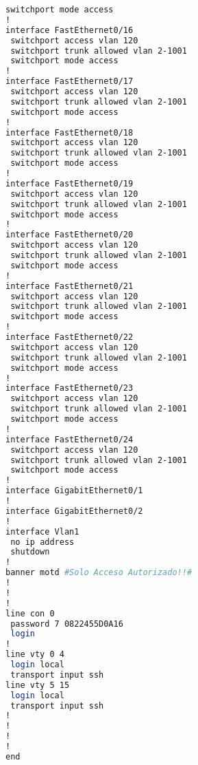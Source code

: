 \begin{lstlisting}[language=Bash, caption={Configuración Completa Switch Asesoría Jurídica}]
 switchport mode access
!
interface FastEthernet0/16
 switchport access vlan 120
 switchport trunk allowed vlan 2-1001
 switchport mode access
!
interface FastEthernet0/17
 switchport access vlan 120
 switchport trunk allowed vlan 2-1001
 switchport mode access
!
interface FastEthernet0/18
 switchport access vlan 120
 switchport trunk allowed vlan 2-1001
 switchport mode access
!
interface FastEthernet0/19
 switchport access vlan 120
 switchport trunk allowed vlan 2-1001
 switchport mode access
!
interface FastEthernet0/20
 switchport access vlan 120
 switchport trunk allowed vlan 2-1001
 switchport mode access
!
interface FastEthernet0/21
 switchport access vlan 120
 switchport trunk allowed vlan 2-1001
 switchport mode access
!
interface FastEthernet0/22
 switchport access vlan 120
 switchport trunk allowed vlan 2-1001
 switchport mode access
!
interface FastEthernet0/23
 switchport access vlan 120
 switchport trunk allowed vlan 2-1001
 switchport mode access
!
interface FastEthernet0/24
 switchport access vlan 120
 switchport trunk allowed vlan 2-1001
 switchport mode access
!
interface GigabitEthernet0/1
!
interface GigabitEthernet0/2
!
interface Vlan1
 no ip address
 shutdown
!
banner motd #Solo Acceso Autorizado!!#
!
!
!
line con 0
 password 7 0822455D0A16
 login
!
line vty 0 4
 login local
 transport input ssh
line vty 5 15
 login local
 transport input ssh
!
!
!
!
end
\end{lstlisting}
